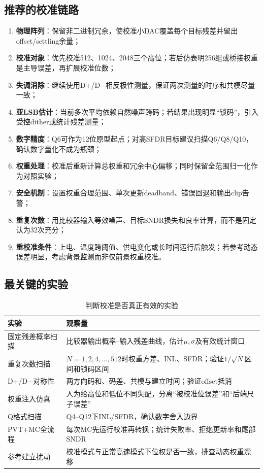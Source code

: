 \documentclass[UTF8,a4paper,11pt]{ctexart}
\begin{document}
\subsection{推荐的校准链路}

\begin{enumerate}
  \item \textbf{物理阵列}：保留非二进制冗余，使校准小DAC覆盖每个目标残差并留出offset/settling余量；
  \item \textbf{校准对象}：优先校准512、1024、2048三个高位；若后仿表明256组或桥接权重是主导误差，再扩展校准位数；
  \item \textbf{失调消除}：继续使用D+/D$-$相反极性测量，保证两次测量的时序和共模尽量一致；
  \item \textbf{亚LSB估计}：当前多次平均依赖自然噪声跨码；若结果出现明显“锁码”，引入受控dither或统计残差测量；
  \item \textbf{数字精度}：Q6可作为12位原型起点；对高SFDR目标建议扫描Q6/Q8/Q10，确认数字量化不成为瓶颈；
  \item \textbf{权重处理}：校准后重新计算总权重和冗余中心偏移；同时保留全范围归一化作为对照实验；
  \item \textbf{安全机制}：设置权重合理范围、单次更新deadband、错误回退和输出clip告警；
  \item \textbf{重复次数}：用比较器输入等效噪声、目标SNDR损失和良率计算，而不是固定认为32次充分；
  \item \textbf{重校准条件}：上电、温度跨阈值、供电变化或长时间运行后触发；若参考动态误差明显，考虑背景监测而非仅前景权重校准。
\end{enumerate}

\subsection{最关键的实验}

\begin{table}[H]
\centering
\caption{判断校准是否真正有效的实验}
\begin{tabularx}{\textwidth}{p{3.4cm}X}
\toprule
实验 & 观察量\\
\midrule
固定残差概率扫描 & 比较器输出概率--输入残差曲线，估计$\mu,\sigma$及有效统计窗口\\
重复次数扫描 & $N=1,2,4,\ldots,512$时权重方差、INL、SFDR；验证$1/\sqrt N$区间和锁码区间\\
D+/D$-$对称性 & 两方向码和、码差、共模与建立时间；验证offset抵消\\
权重注入仿真 & 人为给高位和低位不同失配，分离“被校准位误差”和“后端尺子误差”\\
Q格式扫描 & Q4--Q12下INL/SFDR，确认数字舍入边界\\
PVT+MC全流程 & 每次MC先运行校准再转换；统计失败率、拒绝更新率和尾部SNDR\\
参考建立扰动 & 校准模式与正常高速模式下位权是否一致，排查动态权重漂移\\
\bottomrule
\end{tabularx}
\end{table}
\end{document}
